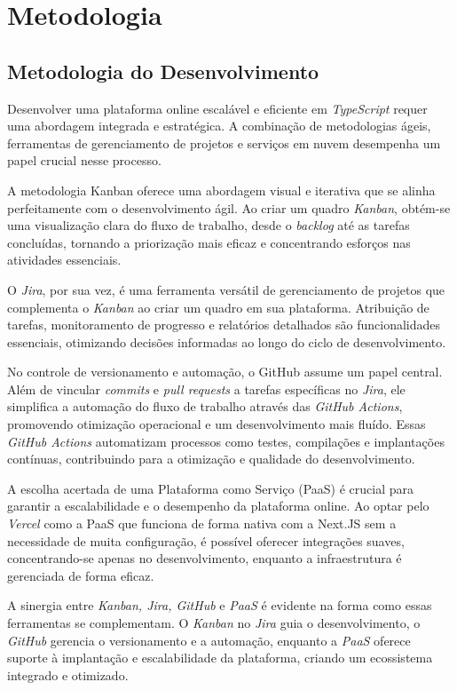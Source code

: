 \part{Metodologia}
\chapter{Metodologia do Desenvolvimento}
Desenvolver uma plataforma online escalável e eficiente em \textit{TypeScript} requer uma abordagem integrada e estratégica. A combinação de metodologias ágeis, ferramentas de gerenciamento de projetos e serviços em nuvem desempenha um papel crucial nesse processo.

A metodologia Kanban oferece uma abordagem visual e iterativa que se alinha perfeitamente com o desenvolvimento ágil. Ao criar um quadro \textit{Kanban}, obtém-se uma visualização clara do fluxo de trabalho, desde o \textit{backlog} até as tarefas concluídas, tornando a priorização mais eficaz e concentrando esforços nas atividades essenciais.

O \textit{Jira}, por sua vez, é uma ferramenta versátil de gerenciamento de projetos que complementa o \textit{Kanban} ao criar um quadro em sua plataforma. Atribuição de tarefas, monitoramento de progresso e relatórios detalhados são funcionalidades essenciais, otimizando decisões informadas ao longo do ciclo de desenvolvimento.

No controle de versionamento e automação, o GitHub assume um papel central. Além de vincular \textit{commits} e \textit{pull requests} a tarefas específicas no \textit{Jira}, ele simplifica a automação do fluxo de trabalho através das \textit{GitHub Actions}, promovendo otimização operacional e um desenvolvimento mais fluído. Essas \textit{GitHub Actions} automatizam processos como testes, compilações e implantações contínuas, contribuindo para a otimização e qualidade do desenvolvimento.

A escolha acertada de uma Plataforma como Serviço (PaaS) é crucial para garantir a escalabilidade e o desempenho da plataforma online. Ao optar pelo \textit{Vercel} como a PaaS que funciona de forma nativa com a Next.JS sem a necessidade de muita configuração, é possível oferecer integrações suaves, concentrando-se apenas no desenvolvimento, enquanto a infraestrutura é gerenciada de forma eficaz.

A sinergia entre \textit{Kanban, Jira, GitHub} e \textit{PaaS} é evidente na forma como essas ferramentas se complementam. O \textit{Kanban} no \textit{Jira} guia o desenvolvimento, o \textit{GitHub} gerencia o versionamento e a automação, enquanto a \textit{PaaS} oferece suporte à implantação e escalabilidade da plataforma, criando um ecossistema integrado e otimizado.

